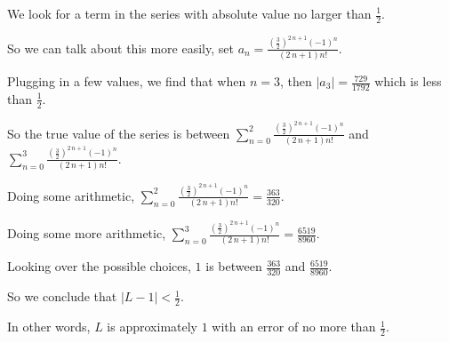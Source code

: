\documentclass{ximera}
\begin{document}
\begin{question}
\begin{solution}
  \begin{hint}
    We look for a term in the series with absolute value no larger than \(\displaystyle\frac{1}{2}\).
  \end{hint}
  \begin{hint}
    So we can talk about this more easily, set \(a_{n} = \displaystyle\frac{\left(\displaystyle\frac{3}{2}\right)^{2 \, n + 1} \left(-1\right)^{n}}{{\left(2 \, n + 1\right)} n!}\).
  \end{hint}
  \begin{hint}
    Plugging in a few values, we find that when \(n = 3\), then \(|a_{3}| = \displaystyle\frac{729}{1792}\) which is less than \(\displaystyle\frac{1}{2}\).
  \end{hint}
  \begin{hint}
    So the true value of the series is between \(\displaystyle\sum_{n = 0}^{2} \displaystyle\frac{\left(\displaystyle\frac{3}{2}\right)^{2 \, n + 1} \left(-1\right)^{n}}{{\left(2 \, n + 1\right)} n!}\) and \(\displaystyle\sum_{n = 0}^{3} \displaystyle\frac{\left(\displaystyle\frac{3}{2}\right)^{2 \, n + 1} \left(-1\right)^{n}}{{\left(2 \, n + 1\right)} n!}\).
  \end{hint}
  \begin{hint}
    Doing some arithmetic, \(\displaystyle\sum_{n = 0}^{2} \displaystyle\frac{\left(\displaystyle\frac{3}{2}\right)^{2 \, n + 1} \left(-1\right)^{n}}{{\left(2 \, n + 1\right)} n!} = \displaystyle\frac{363}{320}\).
  \end{hint}
  \begin{hint}
    Doing some more arithmetic, \(\displaystyle\sum_{n = 0}^{3} \displaystyle\frac{\left(\displaystyle\frac{3}{2}\right)^{2 \, n + 1} \left(-1\right)^{n}}{{\left(2 \, n + 1\right)} n!} = \displaystyle\frac{6519}{8960}\).
  \end{hint}
  \begin{hint}
    Looking over the possible choices, \(1\) is between \(\displaystyle\frac{363}{320}\) and \(\displaystyle\frac{6519}{8960}\).
  \end{hint}
  \begin{hint}
    So we conclude that \(\left| L - 1 \right| < \displaystyle\frac{1}{2}\).
  \end{hint}
  \begin{hint}
    In other words, \(L\) is approximately \(1\) with an error of no more than \(\displaystyle\frac{1}{2}\).
    
  \end{hint}
  
  \begin{multiple-choice}
  \end{multiple-choice}

\end{solution}
\end{question}
            
\end{document}
